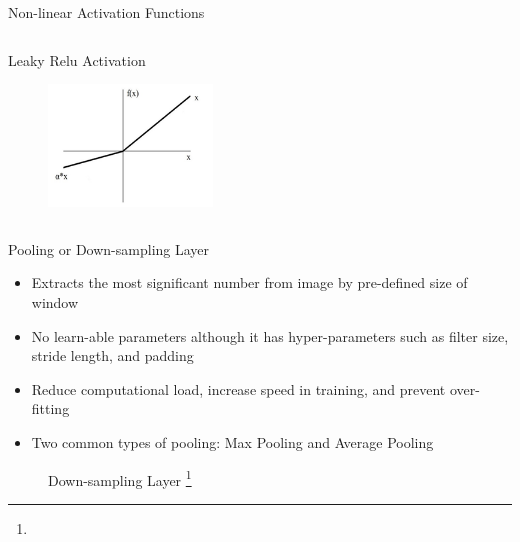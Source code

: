 \documentclass[10pt]{beamer}
\begin{document}
\begin{frame}{Non-linear Activation Functions}
\begin{columns}
        \begin{block}{Leaky Relu Activation}
             \begin{figure}
                  \centering
                   \includegraphics[width=0.6\textwidth]{Images/leakyrelu.png}
            \end{figure}
        \end{block}
    \end{columns}
\end{frame}

\begin{frame}{Pooling or Down-sampling Layer}
    \begin{itemize}
        \item Extracts the most significant number from image by pre-defined size of window
        \item No learn-able parameters although it has hyper-parameters such as filter size, stride length, and padding
        \item Reduce computational load, increase speed in training, and prevent over-fitting
        \item Two common types of pooling: Max Pooling and Average Pooling 
    \end{itemize}

     \begin{figure}
        \centering
        \caption{Down-sampling Layer \footnote[frame]{}}
   \end{figure}    
\end{frame}
\end{document}
